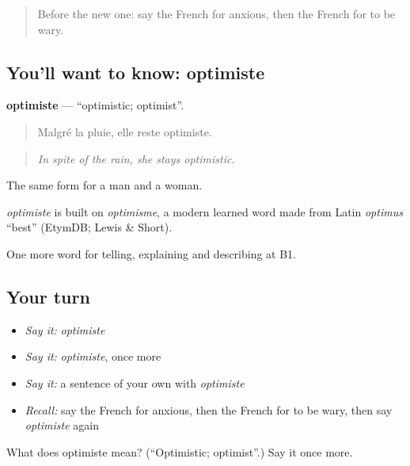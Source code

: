 \begin{quote}
Before the new one: say the French for anxious, then the French for to be wary.
\end{quote}

\subsection*{You'll want to know: optimiste}
\textbf{optimiste} — \textquotedblleft{}optimistic; optimist\textquotedblright{}.

\begin{quote}
Malgré la pluie, elle reste optimiste.
\end{quote}

\begin{quote}
\emph{In spite of the rain, she stays optimistic.}
\end{quote}

The same form for a man and a woman.

\begin{cousinweb}
\emph{optimiste} is built on \emph{optimisme}, a modern learned word made from Latin \emph{optimus} \textquotedblleft{}best\textquotedblright{} (EtymDB; Lewis \& Short).
\end{cousinweb}

\begin{grammarlens}[title={What you've built}]
One more word for telling, explaining and describing at B1.
\end{grammarlens}

\subsection*{Your turn}
\begin{itemize}
\raggedright
  \item \emph{Say it:} \emph{optimiste}
  \item \emph{Say it:} \emph{optimiste}, once more
  \item \emph{Say it:} a sentence of your own with \emph{optimiste}
  \item \emph{Recall:} say the French for anxious, then the French for to be wary, then say \emph{optimiste} again
\end{itemize}

\begin{tcolorbox}[breakable,colback=teal!4,colframe=teal!35!black,title={Before you move on}]
What does optimiste mean? (\textquotedblleft{}Optimistic; optimist\textquotedblright{}.) Say it once more.
\end{tcolorbox}
